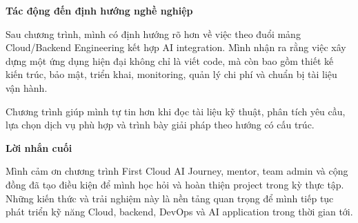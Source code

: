 \vspace{0.5em}\noindent\textbf{Tác động đến định hướng nghề
nghiệp}\par

Sau chương trình, mình có định hướng rõ hơn về việc theo đuổi mảng
Cloud/Backend Engineering kết hợp AI integration. Mình nhận ra rằng việc
xây dựng một ứng dụng hiện đại không chỉ là viết code, mà còn bao gồm
thiết kế kiến trúc, bảo mật, triển khai, monitoring, quản lý chi phí và
chuẩn bị tài liệu vận hành.

Chương trình giúp mình tự tin hơn khi đọc tài liệu kỹ thuật, phân tích
yêu cầu, lựa chọn dịch vụ phù hợp và trình bày giải pháp theo hướng có
cấu trúc.

\vspace{0.5em}\noindent\textbf{Lời nhắn cuối}\par

Mình cảm ơn chương trình First Cloud AI Journey, mentor, team admin và
cộng đồng đã tạo điều kiện để mình học hỏi và hoàn thiện project trong
kỳ thực tập. Những kiến thức và trải nghiệm này là nền tảng quan trọng
để mình tiếp tục phát triển kỹ năng Cloud, backend, DevOps và AI
application trong thời gian tới.
